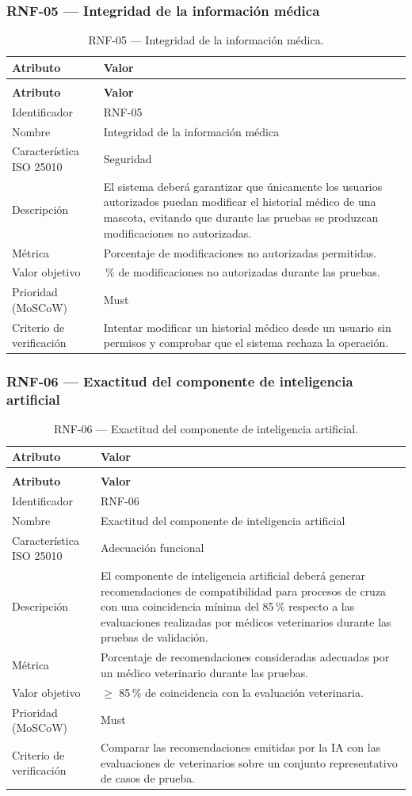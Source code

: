 \documentclass[journal,onecolumn]{IEEEtran}
\makeatletter
\newenvironment{atributos}[2]{%
	\small
	\begin{longtable}{@{}>{\raggedright\arraybackslash}p{4.2cm} >{\raggedright\arraybackslash}p{11.2cm}@{}}
		\caption{#2}\label{tab:#1}\\
		\toprule
		\textbf{Atributo} & \textbf{Valor} \\
		\midrule
		\endfirsthead
		\multicolumn{2}{@{}l}{\small\itshape (continuación)}\\
		\toprule
		\textbf{Atributo} & \textbf{Valor} \\
		\midrule
		\endhead
		\bottomrule
		\endlastfoot
	}{%
	\end{longtable}
	\normalsize
}
\makeatother
\begin{document}
	\subsubsection{RNF-05 --- Integridad de la información médica}
	
	\begin{atributos}{RNF-05}{RNF-05 --- Integridad de la información médica.}
		Identificador & RNF-05 \\
		Nombre & Integridad de la información médica \\
		Característica ISO 25010 & Seguridad \\
		Descripción & El sistema deberá garantizar que únicamente los usuarios autorizados puedan modificar el historial médico de una mascota, evitando que durante las pruebas se produzcan modificaciones no autorizadas. \\
		Métrica & Porcentaje de modificaciones no autorizadas permitidas. \\
		Valor objetivo & 0\,\% de modificaciones no autorizadas durante las pruebas. \\
		Prioridad (MoSCoW) & Must \\
		Criterio de verificación & Intentar modificar un historial médico desde un usuario sin permisos y comprobar que el sistema rechaza la operación. \\
	\end{atributos}
	
	\subsubsection{RNF-06 --- Exactitud del componente de inteligencia artificial}
	
	\begin{atributos}{RNF-06}{RNF-06 --- Exactitud del componente de inteligencia artificial.}
		Identificador & RNF-06 \\
		Nombre & Exactitud del componente de inteligencia artificial \\
		Característica ISO 25010 & Adecuación funcional \\
		Descripción & El componente de inteligencia artificial deberá generar recomendaciones de compatibilidad para procesos de cruza con una coincidencia mínima del 85\,\% respecto a las evaluaciones realizadas por médicos veterinarios durante las pruebas de validación. \\
		Métrica & Porcentaje de recomendaciones consideradas adecuadas por un médico veterinario durante las pruebas. \\
		Valor objetivo & $\geq$ 85\,\% de coincidencia con la evaluación veterinaria. \\
		Prioridad (MoSCoW) & Must \\
		Criterio de verificación & Comparar las recomendaciones emitidas por la IA con las evaluaciones de veterinarios sobre un conjunto representativo de casos de prueba. \\
	\end{atributos}
	
\end{document}
